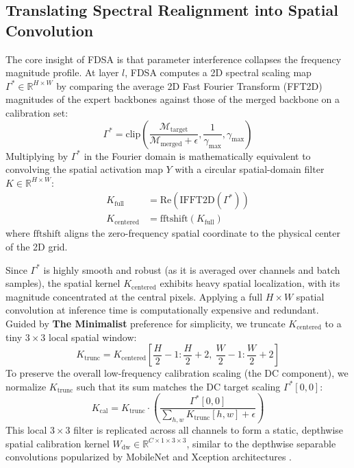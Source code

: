 \documentclass{article}
\theoremstyle{plain}
\theoremstyle{definition}
\theoremstyle{remark}
\begin{document}
\subsection{Translating Spectral Realignment into Spatial Convolution}
The core insight of FDSA is that parameter interference collapses the frequency magnitude profile. At layer $l$, FDSA computes a 2D spectral scaling map $\Gamma^* \in \mathbb{R}^{H \times W}$ by comparing the average 2D Fast Fourier Transform (FFT2D) magnitudes of the expert backbones against those of the merged backbone on a calibration set:
\begin{equation}
    \Gamma^* = \text{clip}\left(\frac{\mathcal{M}_{\text{target}}}{\mathcal{M}_{\text{merged}} + \epsilon}, \frac{1}{\gamma_{\text{max}}}, \gamma_{\text{max}}\right)
\end{equation}
Multiplying by $\Gamma^*$ in the Fourier domain is mathematically equivalent to convolving the spatial activation map $Y$ with a circular spatial-domain filter $K \in \mathbb{R}^{H \times W}$:
\begin{align}
    K_{\text{full}} &= \text{Re}(\text{IFFT2D}(\Gamma^*)) \\
    K_{\text{centered}} &= \text{fftshift}(K_{\text{full}})
\end{align}
where $\text{fftshift}$ aligns the zero-frequency spatial coordinate to the physical center of the 2D grid. 

Since $\Gamma^*$ is highly smooth and robust (as it is averaged over channels and batch samples), the spatial kernel $K_{\text{centered}}$ exhibits heavy spatial localization, with its magnitude concentrated at the central pixels. Applying a full $H \times W$ spatial convolution at inference time is computationally expensive and redundant. Guided by \textbf{The Minimalist} preference for simplicity, we truncate $K_{\text{centered}}$ to a tiny $3 \times 3$ local spatial window:
\begin{equation}
    K_{\text{trunc}} = K_{\text{centered}}\left[\frac{H}{2} - 1 : \frac{H}{2} + 2, \ \frac{W}{2} - 1 : \frac{W}{2} + 2\right]
\end{equation}
To preserve the overall low-frequency calibration scaling (the DC component), we normalize $K_{\text{trunc}}$ such that its sum matches the DC target scaling $\Gamma^*[0,0]$:
\begin{equation}
    K_{\text{cal}} = K_{\text{trunc}} \cdot \left(\frac{\Gamma^*[0,0]}{\sum_{h, w} K_{\text{trunc}}[h, w] + \epsilon}\right)
\end{equation}
This local $3 \times 3$ filter is replicated across all channels to form a static, depthwise spatial calibration kernel $W_{\text{dw}} \in \mathbb{R}^{C \times 1 \times 3 \times 3}$, similar to the depthwise separable convolutions popularized by MobileNet and Xception architectures \cite{howard2017mobilenets, sandler2018mobilenetv2, chollet2017xception}.
\end{document}
